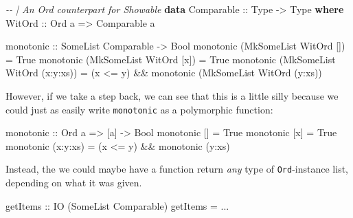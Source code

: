 \documentclass[]{article}
\newenvironment{Shaded}{}{}
\newcommand{\CommentTok}[1]{\textcolor[rgb]{0.38,0.63,0.69}{\textit{#1}}}
\newcommand{\DataTypeTok}[1]{\textcolor[rgb]{0.56,0.13,0.00}{#1}}
\newcommand{\KeywordTok}[1]{\textcolor[rgb]{0.00,0.44,0.13}{\textbf{#1}}}
\newcommand{\NormalTok}[1]{#1}
\newcommand{\OperatorTok}[1]{\textcolor[rgb]{0.40,0.40,0.40}{#1}}
\newcommand{\OtherTok}[1]{\textcolor[rgb]{0.00,0.44,0.13}{#1}}
\begin{document}
\begin{Shaded}
\begin{Highlighting}[]
\CommentTok{{-}{-} | An Ord counterpart for Showable}
\KeywordTok{data} \DataTypeTok{Comparable}\OtherTok{ ::} \DataTypeTok{Type} \OtherTok{{-}\textgreater{}} \DataTypeTok{Type} \KeywordTok{where}
    \DataTypeTok{WitOrd}\OtherTok{ ::} \DataTypeTok{Ord}\NormalTok{ a }\OtherTok{=\textgreater{}} \DataTypeTok{Comparable}\NormalTok{ a}

\OtherTok{monotonic ::} \DataTypeTok{SomeList} \DataTypeTok{Comparable} \OtherTok{{-}\textgreater{}} \DataTypeTok{Bool}
\NormalTok{monotonic (}\DataTypeTok{MkSomeList} \DataTypeTok{WitOrd}\NormalTok{ [])       }\OtherTok{=} \DataTypeTok{True}
\NormalTok{monotonic (}\DataTypeTok{MkSomeList} \DataTypeTok{WitOrd}\NormalTok{ [x])      }\OtherTok{=} \DataTypeTok{True}
\NormalTok{monotonic (}\DataTypeTok{MkSomeList} \DataTypeTok{WitOrd}\NormalTok{ (x}\OperatorTok{:}\NormalTok{y}\OperatorTok{:}\NormalTok{xs)) }\OtherTok{=}
\NormalTok{    (x }\OperatorTok{\textless{}=}\NormalTok{ y) }\OperatorTok{\&\&}\NormalTok{ monotonic (}\DataTypeTok{MkSomeList} \DataTypeTok{WitOrd}\NormalTok{ (y}\OperatorTok{:}\NormalTok{xs))}
\end{Highlighting}
\end{Shaded}

However, if we take a step back, we can see that this is a little silly because
we could just as easily write \texttt{monotonic} as a polymorphic function:

\begin{Shaded}
\begin{Highlighting}[]
\OtherTok{monotonic\textquotesingle{} ::} \DataTypeTok{Ord}\NormalTok{ a }\OtherTok{=\textgreater{}}\NormalTok{ [a] }\OtherTok{{-}\textgreater{}} \DataTypeTok{Bool}
\NormalTok{monotonic\textquotesingle{} []       }\OtherTok{=} \DataTypeTok{True}
\NormalTok{monotonic\textquotesingle{} [x]      }\OtherTok{=} \DataTypeTok{True}
\NormalTok{monotonic\textquotesingle{} (x}\OperatorTok{:}\NormalTok{y}\OperatorTok{:}\NormalTok{xs) }\OtherTok{=}\NormalTok{ (x }\OperatorTok{\textless{}=}\NormalTok{ y) }\OperatorTok{\&\&}\NormalTok{ monotonic\textquotesingle{} (y}\OperatorTok{:}\NormalTok{xs)}
\end{Highlighting}
\end{Shaded}

Instead, the we could maybe have a function return \emph{any} type of
\texttt{Ord}-instance list, depending on what it was given.

\begin{Shaded}
\begin{Highlighting}[]
\OtherTok{getItems ::} \DataTypeTok{IO}\NormalTok{ (}\DataTypeTok{SomeList} \DataTypeTok{Comparable}\NormalTok{)}
\NormalTok{getItems }\OtherTok{=} \OperatorTok{...}
\end{Highlighting}
\end{Shaded}
\end{document}
